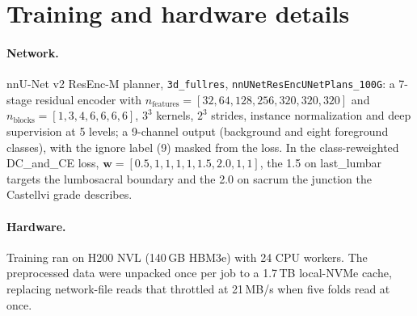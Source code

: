 \section{Training and hardware details}
\label{app:training}

\paragraph{Network.}
nnU-Net v2 ResEnc-M planner, \texttt{3d\_fullres},
\texttt{nnUNetResEncUNetPlans\_100G}: a 7-stage residual
encoder with $n_\text{features}{=}[32,64,128,256,320,320,320]$
and $n_\text{blocks}{=}[1,3,4,6,6,6,6]$, $3^3$ kernels,
$2^3$ strides, instance normalization and deep supervision
at 5 levels; a 9-channel output (background and eight
foreground classes), with the ignore label (9) masked from
the loss. In the class-reweighted DC\_and\_CE loss,
$\mathbf{w}{=}[0.5,1,1,1,1,1.5,2.0,1,1]$, the 1.5 on
last\_lumbar targets the lumbosacral boundary and the 2.0
on sacrum the junction the Castellvi grade describes.

\paragraph{Hardware.}
Training ran on H200 NVL (140\,GB HBM3e) with 24 CPU
workers. The preprocessed data were unpacked once per
job to a 1.7\,TB local-NVMe cache, replacing network-file
reads that throttled at 21\,MB/s when five folds read at
once.
